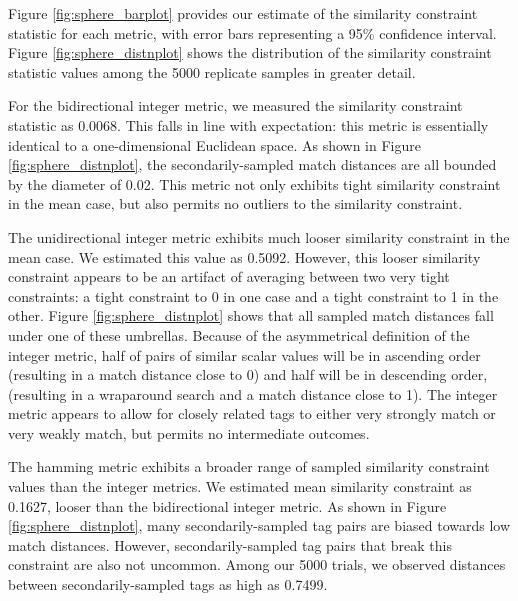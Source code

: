 
Figure \ref{fig:sphere_barplot} provides our estimate of the similarity constraint statistic for each metric, with error bars representing a 95\% confidence interval.
Figure \ref{fig:sphere_distnplot} shows the distribution of the similarity constraint statistic values among the 5000 replicate samples in greater detail.

For the bidirectional integer metric, we measured the similarity constraint statistic as 0.0068.
This falls in line with expectation: this metric is essentially identical to a one-dimensional Euclidean space.
As shown in Figure \ref{fig:sphere_distnplot}, the secondarily-sampled match distances are all bounded by the diameter of 0.02.
This metric not only exhibits tight similarity constraint in the mean case, but also permits no outliers to the similarity constraint.

The unidirectional integer metric exhibits much looser similarity constraint in the mean case.
We estimated this value as 0.5092.
However, this looser similarity constraint appears to be an artifact of averaging between two very tight constraints: a tight constraint to 0 in one case and a tight constraint to 1 in the other.
Figure \ref{fig:sphere_distnplot} shows that all sampled match distances fall under one of these umbrellas.
Because of the asymmetrical definition of the integer metric, half of pairs of similar scalar values will be in ascending order (resulting in a match distance close to 0) and half will be in descending order, (resulting in a wraparound search and a match distance close to 1).
The integer metric appears to allow for closely related tags to either very strongly match or very weakly match, but permits no intermediate outcomes.

The hamming metric exhibits a broader range of sampled similarity constraint values than the integer metrics.
We estimated mean similarity constraint as 0.1627, looser than the bidirectional integer metric.
As shown in Figure \ref{fig:sphere_distnplot}, many secondarily-sampled tag pairs are biased towards low match distances.
However, secondarily-sampled tag pairs that break this constraint are also not uncommon.
Among our 5000 trials, we observed distances between secondarily-sampled tags as high as 0.7499.

